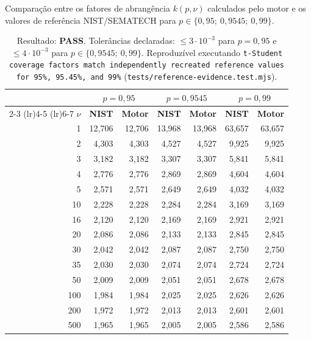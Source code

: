 \documentclass[11pt,a4paper]{article}
\begin{document}
Comparação entre os fatores de abrangência \(k(p, \nu)\) calculados pelo motor e os valores de referência NIST/SEMATECH para \(p \in \{0{,}95;\ 0{,}9545;\ 0{,}99\}\).

\begin{table}[h]
  \centering
  \small
  \begin{tabularx}{\textwidth}{r r r r r r r}
    \toprule
    & \multicolumn{2}{c}{\(p = 0{,}95\)} & \multicolumn{2}{c}{\(p = 0{,}9545\)} & \multicolumn{2}{c}{\(p = 0{,}99\)} \\
    \cmidrule(lr){2-3} \cmidrule(lr){4-5} \cmidrule(lr){6-7}
    \(\nu\) & \textbf{NIST} & \textbf{Motor} & \textbf{NIST} & \textbf{Motor} & \textbf{NIST} & \textbf{Motor} \\
    \midrule
    1   & 12,706 & 12,706 & 13,968 & 13,968 & 63,657 & 63,657 \\
    2   & 4,303  & 4,303  & 4,527  & 4,527  & 9,925  & 9,925 \\
    3   & 3,182  & 3,182  & 3,307  & 3,307  & 5,841  & 5,841 \\
    4   & 2,776  & 2,776  & 2,869  & 2,869  & 4,604  & 4,604 \\
    5   & 2,571  & 2,571  & 2,649  & 2,649  & 4,032  & 4,032 \\
    10  & 2,228  & 2,228  & 2,284  & 2,284  & 3,169  & 3,169 \\
    16  & 2,120  & 2,120  & 2,169  & 2,169  & 2,921  & 2,921 \\
    20  & 2,086  & 2,086  & 2,133  & 2,133  & 2,845  & 2,845 \\
    30  & 2,042  & 2,042  & 2,087  & 2,087  & 2,750  & 2,750 \\
    35  & 2,030  & 2,030  & 2,074  & 2,074  & 2,724  & 2,724 \\
    50  & 2,009  & 2,009  & 2,051  & 2,051  & 2,678  & 2,678 \\
    100 & 1,984  & 1,984  & 2,025  & 2,025  & 2,626  & 2,626 \\
    200 & 1,972  & 1,972  & 2,013  & 2,013  & 2,601  & 2,601 \\
    500 & 1,965  & 1,965  & 2,005  & 2,005  & 2,586  & 2,586 \\
    \bottomrule
  \end{tabularx}
  \caption*{\small Resultado: \textbf{PASS}. Tolerâncias declaradas: \(\leq 3 \cdot 10^{-3}\) para \(p = 0{,}95\) e \(\leq 4 \cdot 10^{-3}\) para \(p \in \{0{,}9545;\ 0{,}99\}\). Reproduzível executando \texttt{t-Student coverage factors match independently recreated reference values for 95\%, 95.45\%, and 99\%} (\texttt{tests/reference-evidence.test.mjs}).}
\end{table}
\end{document}
